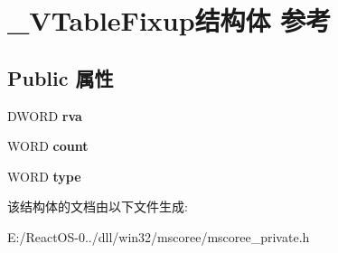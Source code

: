 \hypertarget{struct___v_table_fixup}{}\section{\+\_\+\+V\+Table\+Fixup结构体 参考}
\label{struct___v_table_fixup}
\subsection*{Public 属性}
\begin{DoxyCompactItemize}
\item 
\mbox{\label{struct___v_table_fixup_af316f8be2f5ca3dafd8a758c78827d90}} 
D\+W\+O\+RD {\bfseries rva}
\item 
\mbox{\label{struct___v_table_fixup_a6fc2da9e3a3f4d4b568c15a06b56298c}} 
W\+O\+RD {\bfseries count}
\item 
\mbox{\label{struct___v_table_fixup_a7f51987b550380759eb355d15ef5842f}} 
W\+O\+RD {\bfseries type}
\end{DoxyCompactItemize}


该结构体的文档由以下文件生成\+:\begin{DoxyCompactItemize}
\item 
E\+:/\+React\+O\+S-\/0../dll/win32/mscoree/mscoree\+\_\+private.\+h\end{DoxyCompactItemize}
